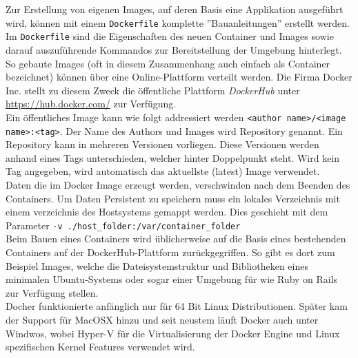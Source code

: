 Zur Erstellung von eigenen Images, auf deren Basis eine Applikation ausgeführt wird, können mit einem \lstinline[]|Dockerfile| komplette ''Bauanleitungen'' erstellt werden. Im \lstinline[]|Dockerfile| sind die Eigenschaften des neuen Container und Images sowie darauf auszuführende Kommandos zur Bereitstellung der Umgebung hinterlegt. \\

So gebaute Images (oft in diesem Zusammenhang auch einfach als Container bezeichnet) können über eine Online-Plattform verteilt werden. Die Firma Docker Inc. stellt zu diesem Zweck die öffentliche Plattform \emph{DockerHub} unter \url{https://hub.docker.com/} zur Verfügung. \\

Ein öffentliches Image kann wie folgt addressiert werden \lstinline[]|<author name>/<image name>:<tag>|. Der Name des Authors und Images wird Repository genannt. Ein Repository kann in mehreren Versionen vorliegen. Diese Versionen werden anhand eines Tags unterschieden, welcher hinter Doppelpunkt steht. Wird kein Tag angegeben, wird automatisch das aktuellste (latest) Image verwendet. \\

Daten die im Docker Image erzeugt werden, verschwinden nach dem Beenden des Containers. Um Daten Persistent zu speichern muss ein lokales Verzeichnis mit einem verzeichnis des Hostsystems gemappt werden. Dies geschieht mit dem Parameter \lstinline[]|-v ./host_folder:/var/container_folder| \\

Beim Bauen eines Containers wird üblicherweise auf die Basis eines bestehenden Containers auf der DockerHub-Plattform zurückgegriffen. So gibt es dort zum Beispiel Images, welche die Dateisystemstruktur und Bibliotheken eines minimalen Ubuntu-Systems oder sogar einer Umgebung für  wie Ruby on Rails zur Verfügung stellen. \\

Docher funktionierte anfänglich nur für 64 Bit Linux Distributionen. Später kam der Support für MacOSX hinzu und seit neustem läuft Docker auch unter Windwos, wobei Hyper-V für die Virtualisierung der Docker Engine und Linux spezifischen Kernel Features verwendet wird.


